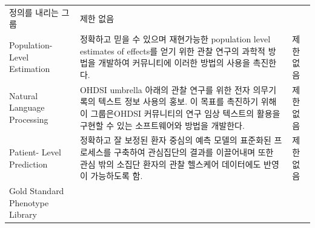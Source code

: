 \documentclass[11pt]{book}
\theoremstyle{definition}
\theoremstyle{definition}
\theoremstyle{definition}
\theoremstyle{remark}
\begin{document}
\begin{longtable}[]{@{}lll@{}}
\begin{minipage}[t]{0.30\columnwidth}
정의를 내리는 그룹\strut
\end{minipage} & \begin{minipage}[t]{0.15\columnwidth}\raggedright\strut
제한 없음\strut
\end{minipage}\tabularnewline
\begin{minipage}[t]{0.11\columnwidth}\raggedright\strut
Population- Level Estimation\strut
\end{minipage} & \begin{minipage}[t]{0.30\columnwidth}\raggedright\strut
정확하고 믿을 수 있으며 재현가능한 population level estimates of
effects를 얻기 위한 관찰 연구의 과학적 방법을 개발하여 커뮤니티에 이러한
방법의 사용을 촉진한다.\strut
\end{minipage} & \begin{minipage}[t]{0.15\columnwidth}\raggedright\strut
제한 없음\strut
\end{minipage}\tabularnewline
\begin{minipage}[t]{0.11\columnwidth}\raggedright\strut
Natural Language Processing\strut
\end{minipage} & \begin{minipage}[t]{0.30\columnwidth}\raggedright\strut
OHDSI umbrella 아래의 관찰 연구를 위한 전자 의무기록의 텍스트 정보
사용의 홍보. 이 목표를 촉진하기 위해 이 그룹은OHDSI 커뮤니티의 연구 임상
텍스트의 활용을 구현할 수 있는 소프트웨어와 방법을 개발한다.\strut
\end{minipage} & \begin{minipage}[t]{0.15\columnwidth}\raggedright\strut
제한 없음\strut
\end{minipage}\tabularnewline
\begin{minipage}[t]{0.11\columnwidth}\raggedright\strut
Patient- Level Prediction\strut
\end{minipage} & \begin{minipage}[t]{0.30\columnwidth}\raggedright\strut
정확하고 잘 보정된 환자 중심의 예측 모델의 표준화된 프로세스를 구축하여
관심집단의 결과를 이끌어내며 또한 관심 밖의 소집단 환자의 관찰 헬스케어
데이터에도 반영이 가능하도록 함.\strut
\end{minipage} & \begin{minipage}[t]{0.15\columnwidth}\raggedright\strut
제한 없음\strut
\end{minipage}\tabularnewline
\begin{minipage}[t]{0.11\columnwidth}\raggedright\strut
Gold Standard Phenotype Library\strut
\end{minipage} & \begin{minipage}[t]{0.30\columnwidth}\raggedright\strut

\end{minipage}
\end{longtable}
\end{document}
